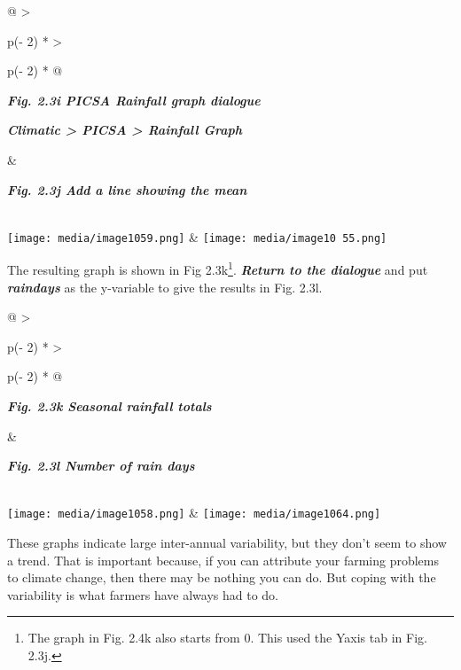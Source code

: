 \documentclass[
  letterpaper,
  DIV=11,
  numbers=noendperiod]{scrreprt}
\begin{document}
\begin{longtable}[]{@{}
  >{\raggedright\arraybackslash}p{(\columnwidth - 2\tabcolsep) * }
  >{\raggedright\arraybackslash}p{(\columnwidth - 2\tabcolsep) * }@{}}
\toprule\noalign{}
\begin{minipage}[b]{\linewidth}\raggedright
\textbf{\emph{Fig. 2.3i PICSA Rainfall graph dialogue}}

\textbf{\emph{Climatic \textgreater{} PICSA \textgreater{} Rainfall
Graph}}
\end{minipage} & \begin{minipage}[b]{\linewidth}\raggedright
\textbf{\emph{Fig. 2.3j Add a line showing the mean}}
\end{minipage} \\
\midrule\noalign{}
\endhead
\bottomrule\noalign{}
\endlastfoot
\texttt{[image: media/image1059.png]}
&
\texttt{[image: media/image10 55.png]} \\
\end{longtable}

The resulting graph is shown in Fig 2.3k\footnote{The graph in Fig. 2.4k
  also starts from 0. This used the Yaxis tab in Fig. 2.3j.}.
\textbf{\emph{Return to the dialogue}} and put \textbf{\emph{raindays}}
as the y-variable to give the results in Fig. 2.3l.

\begin{longtable}[]{@{}
  >{\raggedright\arraybackslash}p{(\columnwidth - 2\tabcolsep) * }
  >{\raggedright\arraybackslash}p{(\columnwidth - 2\tabcolsep) * }@{}}
\toprule\noalign{}
\begin{minipage}[b]{\linewidth}\raggedright
\textbf{\emph{Fig. 2.3k Seasonal rainfall totals}}
\end{minipage} & \begin{minipage}[b]{\linewidth}\raggedright
\textbf{\emph{Fig. 2.3l Number of rain days}}
\end{minipage} \\
\midrule\noalign{}
\endhead
\bottomrule\noalign{}
\endlastfoot
\texttt{[image: media/image1058.png]}
&
\texttt{[image: media/image1064.png]} \\
\end{longtable}

These graphs indicate large inter-annual variability, but they don't
seem to show a trend. That is important because, if you can attribute
your farming problems to climate change, then there may be nothing you
can do. But coping with the variability is what farmers have always had
to do.
\end{document}
